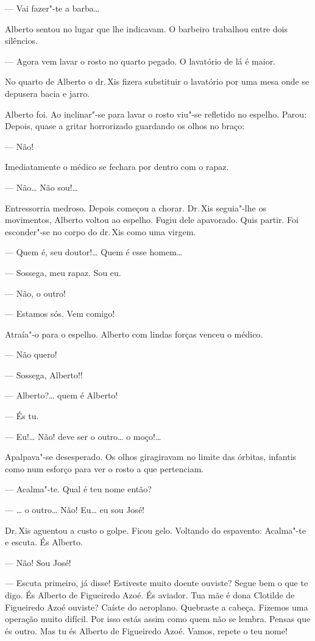 --- Vai fazer"-te a barba\ldots{}

Alberto sentou no lugar que lhe indicavam. O barbeiro trabalhou entre
dois silêncios.

--- Agora vem lavar o rosto no quarto pegado. O lavatório de lá é maior.

No quarto de Alberto o dr.\,Xis fizera substituir o lavatório por uma
mesa onde se depusera bacia e jarro.

Alberto foi. Ao inclinar"-se para lavar o rosto viu"-se refletido no
espelho. Parou: Depois, quase a gritar horrorizado guardando os olhos no
braço:

--- Não!

Imediatamente o médico se fechara por dentro com o rapaz.

--- Não\ldots{} Não sou!\ldots{}

Entressorria medroso. Depois começou a chorar. Dr.\,Xis seguia"-lhe os
movimentos, Alberto voltou ao espelho. Fugiu dele apavorado. Quis
partir. Foi esconder"-se no corpo do dr.\,Xis como uma virgem.

--- Quem é, seu doutor!\ldots{} Quem é esse homem\ldots{}

--- Sossega, meu rapaz. Sou eu.

--- Não, o outro!

--- Estamos sós. Vem comigo!

Atraía"-o para o espelho. Alberto com lindas forças venceu o médico.

--- Não quero!

--- Sossega, Alberto!!

--- Alberto?\ldots{} quem é Alberto!

--- És tu.

--- Eu!\ldots{} Não! deve ser o outro\ldots{} o moço!\ldots{}

Apalpava"-se desesperado. Os olhos giragiravam no limite das órbitas,
infantis como num esforço para ver o rosto a que pertenciam.

--- Acalma"-te. Qual é teu nome então?

--- \ldots{} o outro\ldots{} Não! Eu\ldots{} eu sou José!

Dr.\,Xis aguentou a custo o golpe. Ficou gelo. Voltando do espavento:
Acalma"-te e escuta. És Alberto.

--- Não! Sou José!

--- Escuta primeiro, já disse! Estiveste muito doente ouviste? Segue bem
o que te digo. És Alberto de Figueiredo Azoé. És aviador. Tua mãe é dona
Clotilde de Figueiredo Azoé ouviste? Caíste do aeroplano. Quebraste a
cabeça. Fizemos uma operação muito difícil. Por isso estás assim como
quem não se lembra. Pensas que és outro. Mas tu és Alberto de Figueiredo
Azoé. Vamos, repete o teu nome!

